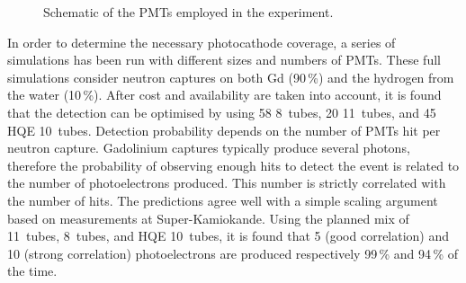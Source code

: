 \begin{figure}
   \caption{Schematic of the PMTs employed in the experiment.}
   \label{fig:pmt}
 \end{figure}

 In order to determine the necessary photocathode coverage, a series of simulations has been run %
 with different sizes and numbers of PMTs.
 These full simulations consider neutron captures on both Gd (90\,\%) and the hydrogen from %
 the water (10\,\%).
 After cost and availability are taken into account, it is found that the detection can be %
 optimised by using 58 8\inch~tubes, 20 11\inch~tubes, and 45 HQE 10\inch~tubes.
 Detection probability depends on the number of PMTs hit per neutron capture. 
 Gadolinium captures typically produce several photons, therefore the probability of observing %
 enough hits to detect the event is related to the number of photoelectrons produced.
 This number is strictly correlated with the number of hits.
 The predictions agree well with a simple scaling argument based on measurements %
 at Super-Kamiokande.
 Using the planned mix of 11\inch~tubes, 8\inch~tubes, and HQE 10\inch~tubes, it is found that %
 5 (good correlation) and 10 (strong correlation) photoelectrons are produced respectively %
 99\,\% and 94\,\% of the time.
 
